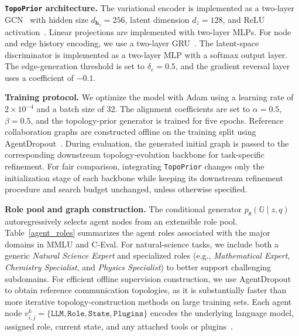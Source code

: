\documentclass[lettersize,journal]{IEEEtran}
\theoremstyle{plain}
\begin{document}
\noindent\textbf{\texttt{TopoPrior} architecture.}
The variational encoder is implemented as a two-layer GCN~\cite{DBLP:conf/iclr/KipfW17} with hidden size $d_{\mathbf{h}_v}=256$, latent dimension $d_z=128$, and ReLU activation~\cite{DBLP:journals/corr/abs-1803-08375}. Linear projections are implemented with two-layer MLPs. For node and edge history encoding, we use a two-layer GRU~\cite{DBLP:journals/corr/ChungGCB14}. The latent-space discriminator is implemented as a two-layer MLP with a softmax output layer. The edge-generation threshold is set to $\delta_e=0.5$, and the gradient reversal layer uses a coefficient of $-0.1$.

\noindent\textbf{Training protocol.}
We optimize the model with Adam using a learning rate of $2\times 10^{-4}$ and a batch size of 32. The alignment coefficients are set to $\alpha=0.5$, $\beta=0.5$, and the topology-prior generator is trained for five epochs. Reference collaboration graphs are constructed offline on the training split using AgentDropout~\cite{DBLP:conf/acl/WangW00Z0025}. During evaluation, the generated initial graph is passed to the corresponding downstream topology-evolution backbone for task-specific refinement. For fair comparison, integrating \texttt{TopoPrior} changes only the initialization stage of each backbone while keeping its downstream refinement procedure and search budget unchanged, unless otherwise specified.

\noindent\textbf{Role pool and graph construction.}
The conditional generator $p_\theta(\mathbb{G}\mid z,q)$ autoregressively selects agent nodes from an extensible role pool. Table~\ref{agent_roles} summarizes the agent roles associated with the major domains in MMLU and C-Eval. For natural-science tasks, we include both a generic \textit{Natural Science Expert} and specialized roles (e.g., \textit{Mathematical Expert}, \textit{Chemistry Specialist}, and \textit{Physics Specialist}) to better support challenging subdomains. For efficient offline supervision construction, we use AgentDropout~\cite{DBLP:conf/acl/WangW00Z0025} to obtain reference communication topologies, as it is substantially faster than more iterative topology-construction methods on large training sets. Each agent node $v_{i,j}^{k}=\{\texttt{LLM}, \texttt{Role}, \texttt{State}, \texttt{Plugins}\}$ encodes the underlying language model, assigned role, current state, and any attached tools or plugins~\cite{DBLP:conf/iclr/ZhangYLYWWCY025}.
\end{document}
